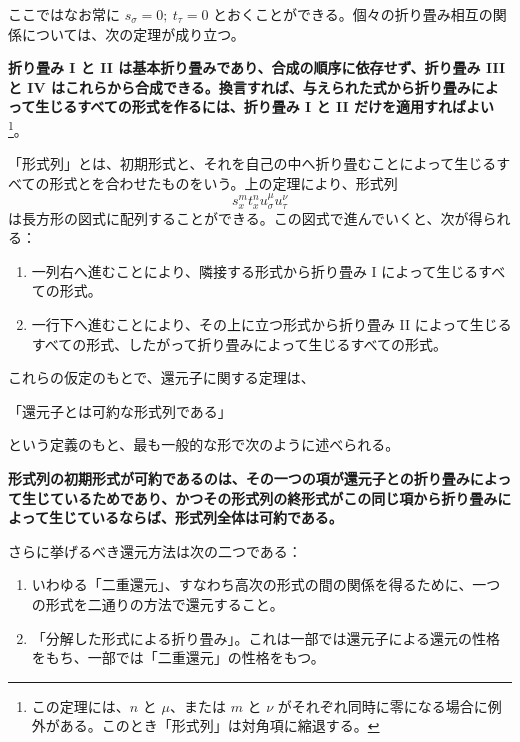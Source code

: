 \documentclass[11pt]{jlreq}
\begin{document}
ここではなお常に \(s_\sigma=0;\ t_\tau=0\) とおくことができる。個々の折り畳み相互の関係については、次の定理が成り立つ。

\textbf{折り畳み I と II は基本折り畳みであり、合成の順序に依存せず、折り畳み III と IV はこれらから合成できる。換言すれば、与えられた式から折り畳みによって生じるすべての形式を作るには、折り畳み I と II だけを適用すればよい}\footnote{この定理には、\(n\) と \(\mu\)、または \(m\) と \(\nu\) がそれぞれ同時に零になる場合に例外がある。このとき「形式列」は対角項に縮退する。}。

「形式列」とは、初期形式と、それを自己の中へ折り畳むことによって生じるすべての形式とを合わせたものをいう。上の定理により、形式列
\[
s_x^m t_x^n u_\sigma^\mu u_\tau^\nu
\]
は長方形の図式に配列することができる。この図式で進んでいくと、次が得られる：
\begin{enumerate}
\item 一列右へ進むことにより、隣接する形式から折り畳み I によって生じるすべての形式。
\item 一行下へ進むことにより、その上に立つ形式から折り畳み II によって生じるすべての形式、したがって折り畳みによって生じるすべての形式。
\end{enumerate}

これらの仮定のもとで、還元子に関する定理は、
\begin{center}
「還元子とは可約な形式列である」
\end{center}
という定義のもと、最も一般的な形で次のように述べられる。

\begin{center}
\textbf{形式列の初期形式が可約であるのは、その一つの項が還元子との折り畳みによって生じているためであり、かつその形式列の終形式がこの同じ項から折り畳みによって生じているならば、形式列全体は可約である。}
\end{center}

さらに挙げるべき還元方法は次の二つである：
\begin{enumerate}
\item いわゆる「二重還元」、すなわち高次の形式の間の関係を得るために、一つの形式を二通りの方法で還元すること。
\item 「分解した形式による折り畳み」。これは一部では還元子による還元の性格をもち、一部では「二重還元」の性格をもつ。
\end{enumerate}
\end{document}
